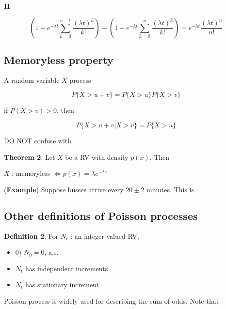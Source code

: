 \documentclass[12pt]{article}
\theoremstyle{nonumberbreak}
\begin{document}
\textbf{II}

$$
(1 - e^{-\lambda t} \sum_{k=0}^{n-1} \frac{(\lambda t)^k}{k!}) - (1 - e^{-\lambda t} \sum_{k=0}^n \frac{(\lambda t)^k}{k!}) = e^{-\lambda t} \frac{(\lambda t)^n}{n!}
$$



\subsection{Memoryless property}


A random variable $X$ process 

$$
P \{ X > u + v \} = P \{ X > u  \} P \{ X > v \}
$$

if $P (X > v) > 0$, then

$$
P \{ X > u + v  | X > v\} = P\{ X > u\}
$$


DO NOT confuse with 


\begin{theorem}
\textbf{Theorem 2}. Let $X$ be a RV with density $p(x)$. Then

\begin{center}
$X$ : memoryless $\Leftrightarrow p(x) = \lambda e^{-\lambda x}$
\end{center}

\end{theorem}


(\textbf{Example}) Suppose busses arrive every $20 \pm 2$ minutes. This is \textbf{}







\subsection{Other definitions of Poisson processes}


\begin{theorem}
\textbf{Definition 2}. For $N_t$ : an integer-valued RV,

\begin{itemize}
	\item 0) $N_0 = 0$, a.s.
	\item $N_t$ has independent increments 
	\item $N_t$ has stationary increment 
\end{itemize}
\end{theorem}


Poisson process is widely used for describing the sum of odds. Note that
\end{document}
